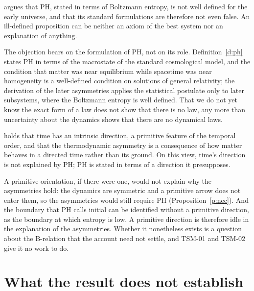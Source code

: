 \documentclass{situationist-preprint}
\begin{document}
\begin{objection}\label{o:earman}
\citet{Earman2006} argues that PH, stated in terms of Boltzmann entropy, is not well defined for the early universe, and that its standard formulations are therefore not even false. An ill-defined proposition can be neither an axiom of the best system nor an explanation of anything.
\end{objection}

\begin{reply}
The objection bears on the formulation of PH, not on its role. Definition~\ref{d:ph} states PH in terms of the macrostate of the standard cosmological model, and the condition that matter was near equilibrium while spacetime was near homogeneity is a well-defined condition on solutions of general relativity; the derivation of the later asymmetries applies the statistical postulate only to later subsystems, where the Boltzmann entropy is well defined. That we do not yet know the exact form of a law does not show that there is no law, any more than uncertainty about the dynamics shows that there are no dynamical laws.
\end{reply}

\begin{objection}\label{o:primitive}
\citet{Maudlin2007} holds that time has an intrinsic direction, a primitive feature of the temporal order, and that the thermodynamic asymmetry is a consequence of how matter behaves in a directed time rather than its ground. On this view, time's direction is not explained by PH; PH is stated in terms of a direction it presupposes.
\end{objection}

\begin{reply}
A primitive orientation, if there were one, would not explain why the asymmetries hold: the dynamics are symmetric and a primitive arrow does not enter them, so the asymmetries would still require PH (Proposition~\ref{p:nec}). And the boundary that PH calls initial can be identified without a primitive direction, as the boundary at which entropy is low. A primitive direction is therefore idle in the explanation of the asymmetries. Whether it nonetheless exists is a question about the B-relation that the account need not settle, and TSM-01 and TSM-02 give it no work to do.
\end{reply}

\section{What the result does not establish}\label{s:limits}
\end{document}
